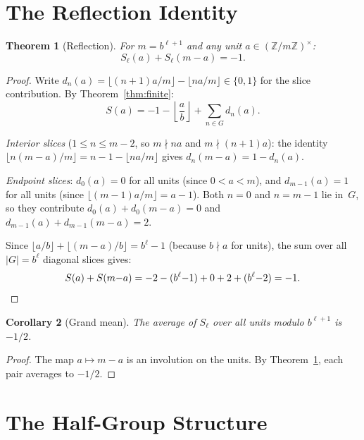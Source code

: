 \documentclass[12pt]{amsart}
\newtheorem{theorem}{Theorem}
\newtheorem{corollary}[theorem]{Corollary}
\theoremstyle{definition}
\theoremstyle{remark}
\begin{document}
\section{The Reflection Identity}

\begin{theorem}[Reflection]\label{thm:reflection}
For $m = b^{\ell+1}$ and any unit
$a \in (\mathbb{Z}/m\mathbb{Z})^{\times}$:
\[
S_{\ell}(a) + S_{\ell}(m - a) = -1.
\]
\end{theorem}

\begin{proof}
Write $d_n(a) = \lfloor(n{+}1)a/m\rfloor
- \lfloor na/m\rfloor \in \{0, 1\}$ for the slice
contribution. By Theorem~\ref{thm:finite}:
\[
S(a) = -1 - \left\lfloor \frac{a}{b} \right\rfloor
+ \sum_{n \in G} d_n(a).
\]

\emph{Interior slices} ($1 \le n \le m{-}2$, so
$m \nmid na$ and $m \nmid (n{+}1)a$): the identity
$\lfloor n(m{-}a)/m \rfloor = n - 1 - \lfloor na/m \rfloor$
gives $d_n(m{-}a) = 1 - d_n(a)$.

\emph{Endpoint slices}: $d_0(a) = 0$ for all units
(since $0 < a < m$), and $d_{m-1}(a) = 1$ for all units
(since $\lfloor(m{-}1)a/m\rfloor = a - 1$). Both $n = 0$
and $n = m{-}1$ lie in~$G$, so they contribute
$d_0(a) + d_0(m{-}a) = 0$ and
$d_{m-1}(a) + d_{m-1}(m{-}a) = 2$.

Since $\lfloor a/b \rfloor + \lfloor(m{-}a)/b\rfloor
= b^{\ell} - 1$ (because $b \nmid a$ for units), the
sum over all $|G| = b^{\ell}$ diagonal slices gives:
\[
S(a) + S(m{-}a) = -2 - (b^{\ell}{-}1) + 0 + 2
+ (b^{\ell}{-}2) = -1. \qedhere
\]
\end{proof}

\begin{corollary}[Grand mean]\label{cor:grand-mean}
The average of $S_{\ell}$ over all units modulo
$b^{\ell+1}$ is $-1/2$.
\end{corollary}

\begin{proof}
The map $a \mapsto m - a$ is an involution on the units.
By Theorem~\ref{thm:reflection}, each pair averages
to $-1/2$.
\end{proof}

\section{The Half-Group Structure}
\end{document}
